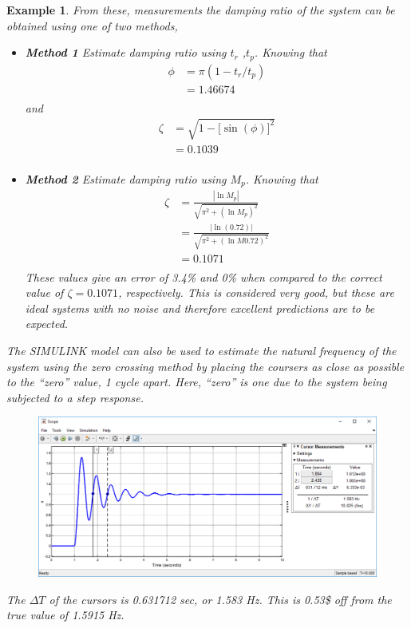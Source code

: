 \documentclass[12pt,letter]{article}
\newtheorem{ex}{Example}
\numberwithin{ex}{section} %
\newenvironment{example}{\begin{mdframed}[middlelinewidth=0.5mm]\begin{ex}\normalfont}{\end{ex}\end{mdframed}}
\numberwithin{re}{section} %
\numberwithin{equation}{section}	%
\begin{document}
\begin{example}
From these, measurements the damping ratio of the system can be obtained using one of two methods, 
\begin{itemize}
\item \textbf{Method 1} Estimate damping ratio using $t_r$ ,$t_p$. Knowing that 
\begin{align}
\phi &= \pi(1-t_r/t_p) \\
&= 1.46674 \nonumber \\
\end{align}
and 
\begin{align}
\zeta &= \sqrt{1-\big[\sin (\phi)\big]^2} \\
&= 0.1039 \nonumber \\
\end{align}
\item \textbf{Method 2} Estimate damping ratio using $M_p$. Knowing that 
\begin{align}
\zeta &= \frac{|\ln M_p|}{\sqrt{\pi^2 + (\ln M_p)^2}} \\
&= \frac{|\ln (0.72)|}{\sqrt{\pi^2 + (\ln M0.72)^2}} \nonumber \\
&=  0.1071 \nonumber \\
\end{align}
These values give an error of 3.4\% and 0\% when compared to the correct value of $\zeta = 0.1071$, respectively. This is considered very good, but these are ideal systems with no noise and therefore excellent predictions are to be expected. 
\end{itemize}

The SIMULINK model can also be used to estimate the natural frequency of the system using the zero crossing method by placing the coursers as close as possible to the ``zero'' value, 1 cycle apart. Here, ``zero'' is one due to the system being subjected to a step response.
\begin{figure}[H]
	\centering
	\includegraphics[width=6.0in]{../figures/Simulink_step_model_transfer_cursor_measurements_2nd_oder_3}
\end{figure}
The $\Delta T$ of the cursors is 0.631712 sec, or 1.583 Hz. This is 0.53\$ off from the true value of 1.5915 Hz. 
\end{example}
\end{document}
